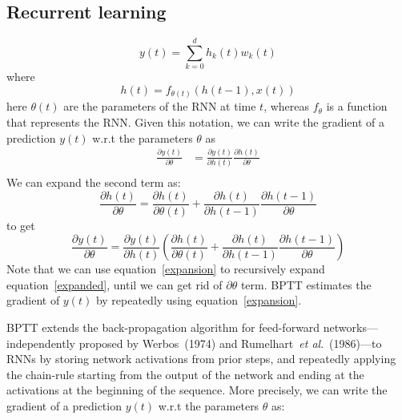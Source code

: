 \documentclass[twoside,11pt]{article}
\newcommand{\etal}{\textit{et al}.}
\begin{document}
\subsection{Recurrent learning} 
\begin{equation}
y(t) = \sum_{k=0}^{d} h_k(t)w_k(t)
\end{equation}
where 
\begin{equation}
h(t) = f_{\theta(t)}\left(h(t-1), x(t)\right)
\end{equation}
here $\theta(t)$ are the parameters of the RNN at time $t$, whereas $f_\theta$ is a function that represents the RNN. Given this notation, we can write the gradient of a prediction $y(t)$ w.r.t the parameters $\theta$ as
\begin{equation}
\begin{aligned}
\frac{\partial{y(t)}}{\partial{\theta}} & = \frac{\partial{y(t)}}{\partial{h(t)}}\frac{\partial{h(t)}}{\partial{\theta}}   \\
\end{aligned}
\end{equation}
We can expand the second term as: 
\begin{equation}
\frac{\partial{h(t)}}{\partial{\theta}} =  \frac{\partial{h(t)}}{\partial{\theta(t)}} + \frac{\partial{h(t)}}{\partial{h(t-1)}} \frac{\partial{h(t-1)}}{\partial{\theta}}
\label{expansion}
\end{equation}
to get
\begin{equation}
\frac{\partial{y(t)}}{\partial{\theta}}  = \frac{\partial{y(t)}}{\partial{h(t)}}\left(\frac{\partial{h(t)}}{\partial{\theta(t)}} + \frac{\partial{h(t)}}{\partial{h(t-1)}} \frac{\partial{h(t-1)}}{\partial{\theta}}  \right) 
\label{expanded}
\end{equation}
Note that we can use equation~\ref{expansion} to recursively expand equation~\ref{expanded}, until we can get rid of $\partial \theta$ term.  
BPTT estimates the gradient of $y(t)$ by repeatedly using equation~\ref{expansion}. 

BPTT extends the back-propagation algorithm for feed-forward networks---independently proposed by Werbos~(1974) and Rumelhart~\etal~(1986)---to RNNs by storing network activations from prior steps, and repeatedly applying the chain-rule starting from the output of the network and ending at the activations at the beginning of the sequence. More precisely, we can write the gradient of a prediction $y(t)$ w.r.t the parameters $\theta$ as:
\end{document}
